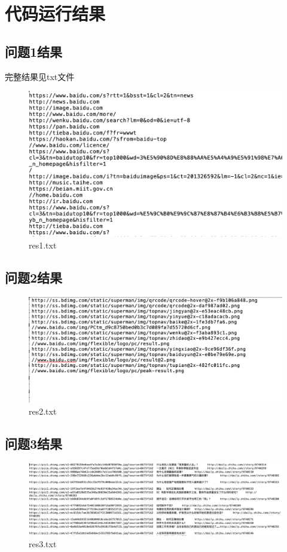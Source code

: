 \documentclass[12pt,a4paper]{article}
\begin{document}
\section{代码运行结果}
\subsection{问题1结果}
完整结果见txt文件
\begin{figure}[H]
	\includegraphics[scale=0.7]{res1.png}
	 \caption{res1.txt}
\end{figure}

\subsection{问题2结果}
\begin{figure}[H]
	\includegraphics[scale=0.7]{res2.png}
	 \caption{res2.txt}
\end{figure}

\subsection{问题3结果}
\begin{figure}[H]
	\includegraphics[scale=0.7]{res3.png}
	 \caption{res3.txt}
\end{figure}
\end{document}
